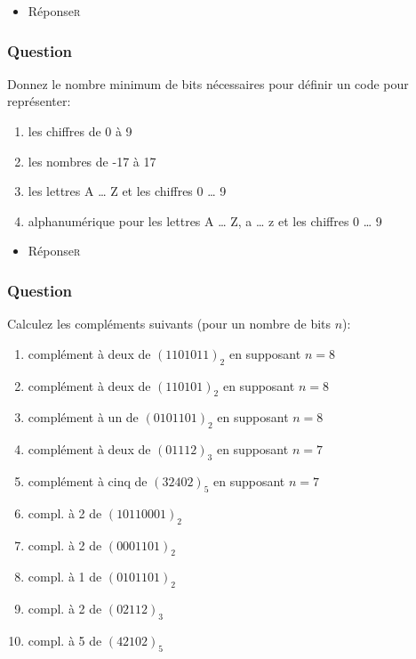 \documentclass[11pt]{article}
\begin{document}
\begin{itemize}
\item Réponse\hfill{}\textsc{r}
\label{sec:org672f9b3}
\end{itemize}

\subsubsection*{Question}
\label{sec:org614f988}
Donnez le nombre minimum de bits nécessaires pour définir un code
   pour représenter:

\begin{enumerate}
\item les chiffres de 0 à 9

\item les nombres de -17 à 17

\item les lettres A \dots{} Z et les chiffres 0 \dots{} 9

\item alphanumérique pour les lettres A \dots{} Z, a \dots{} z et les
chiffres 0 \dots{} 9
\end{enumerate}

\begin{itemize}
\item Réponse\hfill{}\textsc{r}
\label{sec:org30dc3de}
\end{itemize}

\subsubsection*{Question}
\label{sec:org72d60d8}
Calculez les compléments suivants (pour un nombre de bits \(n\)):

\begin{enumerate}
\item complément à deux de \((1101011)_2\) en supposant \(n=8\)

\item complément à deux de \((110101)_2\) en supposant \(n=8\)

\item complément à un de \((0101101)_2\) en supposant \(n=8\)

\item complément à deux de \((01112)_3\) en supposant \(n=7\)

\item complément à cinq de \((32402)_5\) en supposant \(n=7\)

\item compl. à 2 de \((10110001)_2\)

\item compl. à 2 de \((0001101)_2\)

\item compl. à 1 de \((0101101)_2\)

\item compl. à 2 de \((02112)_3\)

\item compl. à 5 de \((42102)_5\)
\end{enumerate}
\end{document}
